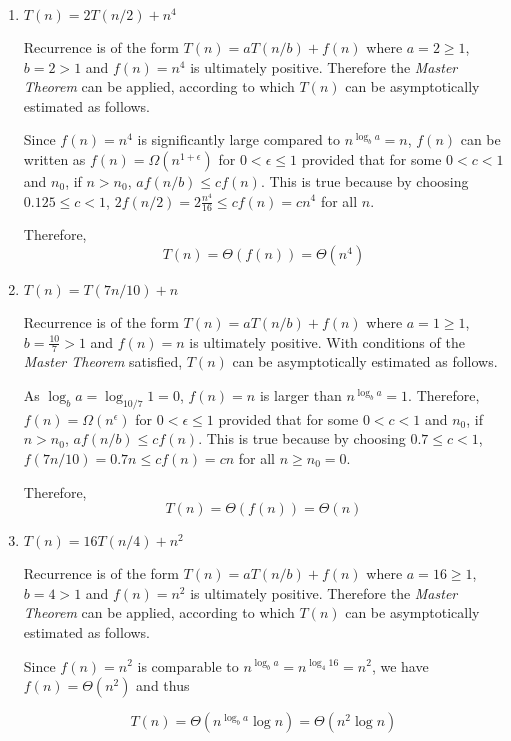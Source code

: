 \begin{enumerate}[label=(\alph*)]
\item $T(n) = 2T(n/2) + n^4$

Recurrence is of the form $T(n) = aT(n/b)+f(n)$ where $a=2 \geq 1$, $b=2 > 1$ and $f(n) = n^4$ is ultimately positive.
Therefore the \emph{Master Theorem} can be applied, according to which $T(n)$ can be asymptotically estimated as follows.

Since $f(n) = n^4$ is significantly large compared to $n^{\log_b a}=n$, $f(n)$ can be written as $f(n) = \Omega(n^{1+\epsilon})$ for $0 < \epsilon \leq 1$ provided that for some $0<c<1$ and $n_0$, if $n > n_0$, $af(n/b) \leq c f(n)$.
This is true because by choosing $0.125 \leq c < 1$, $2f(n/2)=2\frac{n^4}{16}\leq cf(n)=cn^4$ for all $n$.

Therefore,
\begin{equation}
T(n) = \Theta(f(n)) = \Theta(n^4)
\end{equation}

\item $T(n) = T(7n/10) + n$

Recurrence is of the form $T(n) = aT(n/b) + f(n)$ where $a = 1 \geq 1$, $b = \frac{10}{7} > 1$ and $f(n) = n$ is ultimately positive.
With conditions of the \emph{Master Theorem} satisfied, $T(n)$ can be asymptotically estimated as follows.

As $\log_b a = \log_{10/7} 1 = 0$, $f(n) = n$ is larger than $n^{\log_b a} = 1$.
Therefore, $f(n) = \Omega(n^\epsilon)$ for $0 < \epsilon \leq 1$ provided that for some $0<c<1$ and $n_0$, if $n > n_0$, $af(n/b) \leq c f(n)$.
This is true because by choosing $0.7 \leq c < 1$, $f(7n/10) = 0.7n \leq cf(n) = cn$ for all $n \geq n_0 = 0$.

Therefore,
\begin{equation}
T(n) = \Theta(f(n)) = \Theta(n)
\end{equation}

\item $T(n) = 16T(n/4) + n^2$

Recurrence is of the form $T(n) = aT(n/b)+f(n)$ where $a=16 \geq 1$, $b=4 > 1$ and $f(n) = n^2$ is ultimately positive.
Therefore the \emph{Master Theorem} can be applied, according to which $T(n)$ can be asymptotically estimated as follows.

Since $f(n) = n^2$ is comparable to $n^{\log_b a}=n^{\log_4 16}=n^2$, we have $ f(n) = \Theta(n^2)$ and thus

\begin{equation}
T(n) = \Theta(n^{\log_b a}\log n) = \Theta(n^2\log n)
\end{equation}


\end{enumerate}
